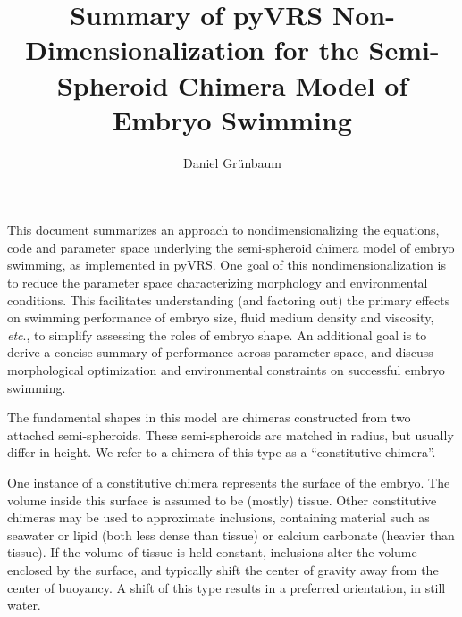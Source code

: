 \documentclass[10pt,a4paper]{article}
\title{Summary of pyVRS Non-Dimensionalization for the Semi-Spheroid Chimera Model of Embryo Swimming}
\author{Daniel Gr\"unbaum}
\def\etc{\emph{etc}.\xspace}
\begin{document}
\maketitle
This document summarizes an approach to nondimensionalizing the equations, code and parameter space underlying the semi-spheroid chimera model of embryo swimming, as implemented in pyVRS. 
One goal of this nondimensionalization is to reduce the parameter space characterizing morphology and environmental conditions. 
This facilitates understanding (and factoring out) the primary effects on swimming performance of embryo size, fluid medium density and viscosity, \etc, to simplify assessing the roles of embryo shape.
An additional goal is to derive a concise summary of performance across parameter space, and discuss morphological optimization and environmental constraints on successful embryo swimming.

The fundamental shapes in this model are chimeras constructed from two attached semi-spheroids. These semi-spheroids are matched in radius, but usually differ in height. 
We refer to a chimera of this type as a ``constitutive chimera''.

One instance of a constitutive chimera represents the surface of the embryo.
The volume inside this surface is assumed to be (mostly) tissue. 
Other constitutive chimeras may be used to approximate inclusions, containing material such as seawater or lipid (both less dense than tissue) or calcium carbonate (heavier than tissue).
If the volume of tissue is held constant, inclusions alter the volume enclosed by the surface, and typically shift the center of gravity away from the center of buoyancy.
A shift of this type results in a preferred orientation, in still water.
\end{document}
